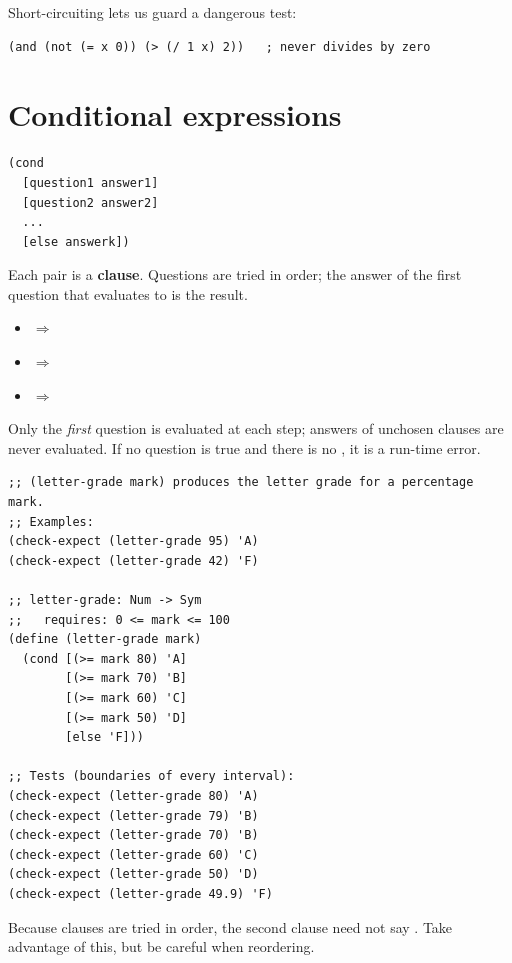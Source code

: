 Short-circuiting lets us guard a dangerous test:
\begin{lstlisting}[style=racket]
(and (not (= x 0)) (> (/ 1 x) 2))   ; never divides by zero
\end{lstlisting}

\section{Conditional expressions}

\begin{lstlisting}[style=racket]
(cond
  [question1 answer1]
  [question2 answer2]
  ...
  [else answerk])
\end{lstlisting}
Each  pair is a \textbf{clause}. Questions are tried in
order; the answer of the first question that evaluates to  is the
result.

\begin{important}
\begin{itemize}
  \item {} $\Rightarrow$ 
  \item {} $\Rightarrow$ 
  \item {} $\Rightarrow$ 
\end{itemize}
Only the \emph{first} question is evaluated at each step; answers of
unchosen clauses are never evaluated. If no question is true and there is no
, it is a run-time error.
\end{important}

\begin{example}[Grading]
\begin{lstlisting}[style=racket]
;; (letter-grade mark) produces the letter grade for a percentage mark.
;; Examples:
(check-expect (letter-grade 95) 'A)
(check-expect (letter-grade 42) 'F)

;; letter-grade: Num -> Sym
;;   requires: 0 <= mark <= 100
(define (letter-grade mark)
  (cond [(>= mark 80) 'A]
        [(>= mark 70) 'B]
        [(>= mark 60) 'C]
        [(>= mark 50) 'D]
        [else 'F]))

;; Tests (boundaries of every interval):
(check-expect (letter-grade 80) 'A)
(check-expect (letter-grade 79) 'B)
(check-expect (letter-grade 70) 'B)
(check-expect (letter-grade 60) 'C)
(check-expect (letter-grade 50) 'D)
(check-expect (letter-grade 49.9) 'F)
\end{lstlisting}
Because clauses are tried in order, the second clause need not say
. Take advantage of this, but be careful
when reordering.
\end{example}

